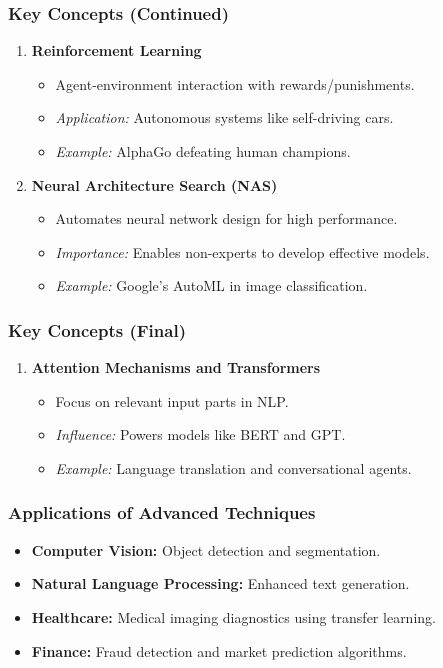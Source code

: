 \documentclass[aspectratio=169]{beamer}
\begin{document}
\begin{frame}[fragile]
    \frametitle{Key Concepts (Continued)}
    \begin{enumerate}[resume]
        \item \textbf{Reinforcement Learning}
        \begin{itemize}
            \item Agent-environment interaction with rewards/punishments.
            \item \textit{Application:} Autonomous systems like self-driving cars.
            \item \textit{Example:} AlphaGo defeating human champions.
        \end{itemize}
        
        \item \textbf{Neural Architecture Search (NAS)}
        \begin{itemize}
            \item Automates neural network design for high performance.
            \item \textit{Importance:} Enables non-experts to develop effective models.
            \item \textit{Example:} Google’s AutoML in image classification.
        \end{itemize}
    \end{enumerate}
\end{frame}

\begin{frame}[fragile]
    \frametitle{Key Concepts (Final)}
    \begin{enumerate}[resume]
        \item \textbf{Attention Mechanisms and Transformers}
        \begin{itemize}
            \item Focus on relevant input parts in NLP.
            \item \textit{Influence:} Powers models like BERT and GPT.
            \item \textit{Example:} Language translation and conversational agents.
        \end{itemize}
    \end{enumerate}
\end{frame}

\begin{frame}[fragile]
    \frametitle{Applications of Advanced Techniques}
    \begin{itemize}
        \item \textbf{Computer Vision:} Object detection and segmentation.
        \item \textbf{Natural Language Processing:} Enhanced text generation.
        \item \textbf{Healthcare:} Medical imaging diagnostics using transfer learning.
        \item \textbf{Finance:} Fraud detection and market prediction algorithms.
    \end{itemize}
\end{frame}
\end{document}
